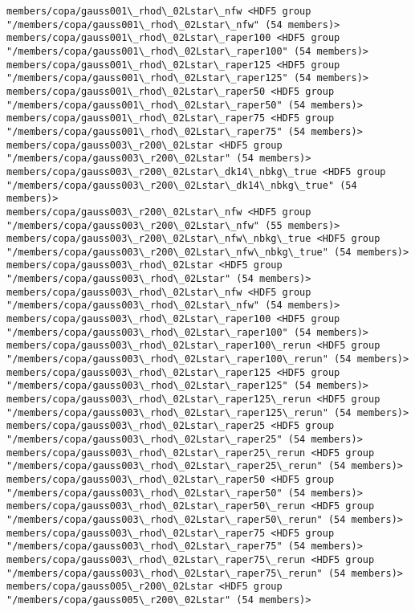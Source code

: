 \documentclass[11pt]{article}
\begin{document}
\begin{Verbatim}[commandchars=\\\{\}]
members/copa/gauss001\_rhod\_02Lstar\_nfw <HDF5 group "/members/copa/gauss001\_rhod\_02Lstar\_nfw" (54 members)>
members/copa/gauss001\_rhod\_02Lstar\_raper100 <HDF5 group "/members/copa/gauss001\_rhod\_02Lstar\_raper100" (54 members)>
members/copa/gauss001\_rhod\_02Lstar\_raper125 <HDF5 group "/members/copa/gauss001\_rhod\_02Lstar\_raper125" (54 members)>
members/copa/gauss001\_rhod\_02Lstar\_raper50 <HDF5 group "/members/copa/gauss001\_rhod\_02Lstar\_raper50" (54 members)>
members/copa/gauss001\_rhod\_02Lstar\_raper75 <HDF5 group "/members/copa/gauss001\_rhod\_02Lstar\_raper75" (54 members)>
members/copa/gauss003\_r200\_02Lstar <HDF5 group "/members/copa/gauss003\_r200\_02Lstar" (54 members)>
members/copa/gauss003\_r200\_02Lstar\_dk14\_nbkg\_true <HDF5 group "/members/copa/gauss003\_r200\_02Lstar\_dk14\_nbkg\_true" (54 members)>
members/copa/gauss003\_r200\_02Lstar\_nfw <HDF5 group "/members/copa/gauss003\_r200\_02Lstar\_nfw" (55 members)>
members/copa/gauss003\_r200\_02Lstar\_nfw\_nbkg\_true <HDF5 group "/members/copa/gauss003\_r200\_02Lstar\_nfw\_nbkg\_true" (54 members)>
members/copa/gauss003\_rhod\_02Lstar <HDF5 group "/members/copa/gauss003\_rhod\_02Lstar" (54 members)>
members/copa/gauss003\_rhod\_02Lstar\_nfw <HDF5 group "/members/copa/gauss003\_rhod\_02Lstar\_nfw" (54 members)>
members/copa/gauss003\_rhod\_02Lstar\_raper100 <HDF5 group "/members/copa/gauss003\_rhod\_02Lstar\_raper100" (54 members)>
members/copa/gauss003\_rhod\_02Lstar\_raper100\_rerun <HDF5 group "/members/copa/gauss003\_rhod\_02Lstar\_raper100\_rerun" (54 members)>
members/copa/gauss003\_rhod\_02Lstar\_raper125 <HDF5 group "/members/copa/gauss003\_rhod\_02Lstar\_raper125" (54 members)>
members/copa/gauss003\_rhod\_02Lstar\_raper125\_rerun <HDF5 group "/members/copa/gauss003\_rhod\_02Lstar\_raper125\_rerun" (54 members)>
members/copa/gauss003\_rhod\_02Lstar\_raper25 <HDF5 group "/members/copa/gauss003\_rhod\_02Lstar\_raper25" (54 members)>
members/copa/gauss003\_rhod\_02Lstar\_raper25\_rerun <HDF5 group "/members/copa/gauss003\_rhod\_02Lstar\_raper25\_rerun" (54 members)>
members/copa/gauss003\_rhod\_02Lstar\_raper50 <HDF5 group "/members/copa/gauss003\_rhod\_02Lstar\_raper50" (54 members)>
members/copa/gauss003\_rhod\_02Lstar\_raper50\_rerun <HDF5 group "/members/copa/gauss003\_rhod\_02Lstar\_raper50\_rerun" (54 members)>
members/copa/gauss003\_rhod\_02Lstar\_raper75 <HDF5 group "/members/copa/gauss003\_rhod\_02Lstar\_raper75" (54 members)>
members/copa/gauss003\_rhod\_02Lstar\_raper75\_rerun <HDF5 group "/members/copa/gauss003\_rhod\_02Lstar\_raper75\_rerun" (54 members)>
members/copa/gauss005\_r200\_02Lstar <HDF5 group "/members/copa/gauss005\_r200\_02Lstar" (54 members)>

\end{Verbatim}
\end{document}
